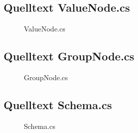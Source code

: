 \subsection{Quelltext ValueNode.cs}
\label{app:ValueNodeSrc}
\begin{figure}[htb]
\centering
{}
\caption{ValueNode.cs}
\end{figure}
\clearpage

\subsection{Quelltext GroupNode.cs}
\label{app:GroupNodeSrc}
\begin{figure}[htb]
\centering
{}
\caption{GroupNode.cs}
\end{figure}
\clearpage


\subsection{Quelltext Schema.cs}
\label{app:SchemaSrc}
\begin{figure}[htb]
\centering
{}
\caption{Schema.cs}
\end{figure}
\clearpage


